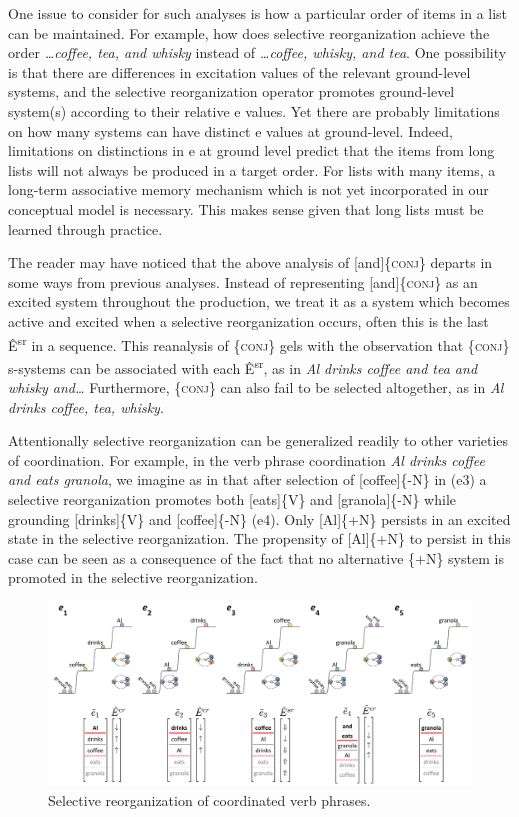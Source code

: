   One issue to consider for such analyses is how a particular order of items in a list can be maintained. For example, how does selective reorganization achieve the order \textit{…coffee, tea, and whisky} instead of \textit{…coffee, whisky, and tea}. One possibility is that there are differences in excitation values of the relevant ground-level systems, and the selective reorganization operator promotes ground-level system(s) according to their relative e values. Yet there are probably limitations on how many systems can have distinct e values at ground-level. Indeed, limitations on distinctions in e at ground level predict that the items from long lists will not always be produced in a target order. For lists with many items, a long-term associative memory mechanism which is not yet incorporated in our conceptual model is necessary. This makes sense given that long lists must be learned through practice.

  The reader may have noticed that the above analysis of [and]\{\textsc{conj}\} departs in some ways from previous analyses. Instead of representing [and]\{\textsc{conj}\} as an excited system throughout the production, we treat it as a system which becomes active and excited when a selective reorganization occurs, often this is the last Ê\textsuperscript{sr} in a sequence. This reanalysis of \{\textsc{conj}\} gels with the observation that \{\textsc{conj}\} s-systems can be associated with each Ê\textsuperscript{sr}, as in \textit{Al drinks coffee and tea and whisky and…} Furthermore, \{\textsc{conj}\} can also fail to be selected altogether, as in \textit{Al drinks coffee, tea, whisky}.

  Attentionally selective reorganization can be generalized readily to other varieties of coordination. For example, in the verb phrase coordination \textit{Al drinks coffee and eats granola}, we imagine as in {} that after selection of [coffee]\{-N\} in (e3) a selective reorganization promotes both [eats]\{V\} and [granola]\{-N\} while grounding [drinks]\{V\} and [coffee]\{-N\} (e4). Only [Al]\{+N\} persists in an excited state in the selective reorganization. The propensity of [Al]\{+N\} to persist in this case can be seen as a consequence of the fact that no alternative \{+N\} system is promoted in the selective reorganization.

  
\begin{figure}
\includegraphics[width=\textwidth]{figures/Tilsen-img100.png}
\caption{Selective reorganization of coordinated verb phrases.}
\label{fig:4:50}
\end{figure}
 

